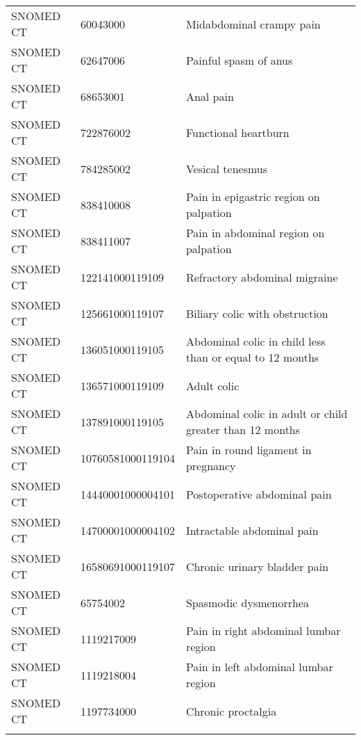 \begin{longtable}{p{}p{}p{}}
  SNOMED CT & 60043000 & Midabdominal crampy pain \\ 
  SNOMED CT & 62647006 & Painful spasm of anus \\ 
  SNOMED CT & 68653001 & Anal pain \\ 
  SNOMED CT & 722876002 & Functional heartburn \\ 
  SNOMED CT & 784285002 & Vesical tenesmus \\ 
  SNOMED CT & 838410008 & Pain in epigastric region on palpation \\ 
  SNOMED CT & 838411007 & Pain in abdominal region on palpation \\ 
  SNOMED CT & 122141000119109 & Refractory abdominal migraine \\ 
  SNOMED CT & 125661000119107 & Biliary colic with obstruction \\ 
  SNOMED CT & 136051000119105 & Abdominal colic in child less than or equal to 12 months \\ 
  SNOMED CT & 136571000119109 & Adult colic \\ 
  SNOMED CT & 137891000119105 & Abdominal colic in adult or child greater than 12 months \\ 
  SNOMED CT & 10760581000119104 & Pain in round ligament in pregnancy \\ 
  SNOMED CT & 14440001000004101 & Postoperative abdominal pain \\ 
  SNOMED CT & 14700001000004102 & Intractable abdominal pain \\ 
  SNOMED CT & 16580691000119107 & Chronic urinary bladder pain \\ 
  SNOMED CT & 65754002 & Spasmodic dysmenorrhea \\ 
  SNOMED CT & 1119217009 & Pain in right abdominal lumbar region \\ 
  SNOMED CT & 1119218004 & Pain in left abdominal lumbar region \\ 
  SNOMED CT & 1197734000 & Chronic proctalgia \\ 
  \hline
\label{tab:codes_abdominal_pain}
\end{longtable}
